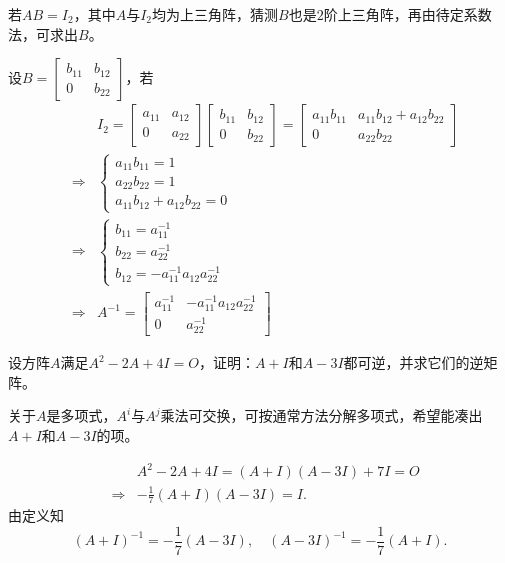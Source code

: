 \begin{solution}
若$AB = I_2$，其中$A$与$I_2$均为上三角阵，猜测$B$也是$2$阶上三角阵，再由待定系数法，可求出$B$。

设$B = \begin{bmatrix} b_{11} & b_{12} \\ 0 & b_{22} \end{bmatrix}$，若
\begin{eqnarray*}
& & I_2 = \begin{bmatrix} a_{11} & a_{12} \\ 0 & a_{22} \end{bmatrix} \begin{bmatrix} b_{11} & b_{12} \\ 0 & b_{22} \end{bmatrix} = \begin{bmatrix} a_{11}b_{11} & a_{11}b_{12} + a_{12}b_{22} \\ 0 & a_{22}b_{22} \end{bmatrix} \\
& \Longrightarrow & \begin{cases} a_{11}b_{11} = 1 \\ a_{22}b_{22} = 1 \\ a_{11}b_{12} + a_{12}b_{22} = 0 \end{cases} \\
& \Longrightarrow & \begin{cases} b_{11} = a_{11}^{-1} \\ b_{22} = a_{22}^{-1} \\ b_{12} = -a_{11}^{-1}a_{12}a_{22}^{-1} \end{cases} \\
& \Longrightarrow & A^{-1} = \begin{bmatrix} a_{11}^{-1} & -a_{11}^{-1}a_{12}a_{22}^{-1} \\ 0 & a_{22}^{-1} \end{bmatrix}
\end{eqnarray*}
\end{solution}

\begin{eg}
设方阵$A$满足$A^2-2A+4I=O$，证明：$A+I$和$A-3I$都可逆，并求它们的逆矩阵。
\end{eg}

\begin{solution}
关于$A$是多项式，$A^i$与$A^j$乘法可交换，可按通常方法分解多项式，希望能凑出$A+I$和$A-3I$的项。

\begin{eqnarray*}
& & A^2-2A+4I = (A+I)(A-3I)+7I = O \\
& \Longrightarrow & -\frac17 (A+I)(A-3I) = I.
\end{eqnarray*}
由定义知
$$(A+I)^{-1} = -\frac17 (A-3I), \quad (A-3I)^{-1} = -\frac17 (A+I).$$
\end{solution}

